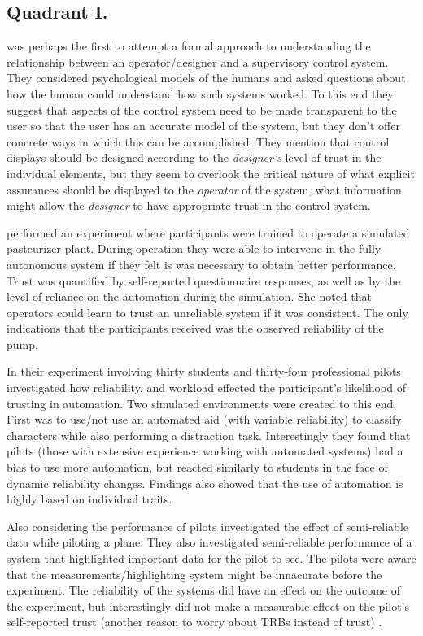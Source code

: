 \subsection{Quadrant I.}
\citet{Sheridan1984-kx} was perhaps the first to attempt a formal approach to understanding the relationship between an operator/designer and a supervisory control system. They considered psychological models of the humans and asked questions about how the human could understand how such systems worked. To this end they suggest that aspects of the control system need to be made transparent to the user so that the user has an accurate model of the system, but they don't offer concrete ways in which this can be accomplished. They mention that control displays should be designed according to the \emph{designer's} level of trust in the individual elements, but they seem to overlook the critical nature of what explicit assurances should be displayed to the \emph{operator} of the system,  what information might allow the \emph{designer} to have appropriate trust in the control system.

\citet{Muir1996-gt} performed an experiment where participants were trained to operate a simulated pasteurizer plant. During operation they were able to intervene in the fully-autonomous system if they felt is was necessary to obtain better performance. Trust was quantified by self-reported questionnaire responses, as well as by the level of reliance on the automation during the simulation. She noted that operators could learn to trust an unreliable system if it was consistent. The only indications that the participants received was the observed reliability of the pump. 

In their experiment involving thirty students and thirty-four professional pilots \citet{Riley1996-qm} investigated how reliability, and workload effected the participant's likelihood of trusting in automation. Two simulated environments were created to this end. First was to use/not use an automated aid (with variable reliability) to classify characters while also performing a distraction task. Interestingly they found that pilots (those with extensive experience working with automated systems) had a bias to use more automation, but reacted similarly to students in the face of dynamic reliability changes. Findings also showed that the use of automation is highly based on individual traits.

Also considering the performance of pilots \citet{Wickens1999-la} investigated the effect of semi-reliable data while piloting a plane. They also investigated semi-reliable performance of a system that highlighted important data for the pilot to see. The pilots were aware that the measurements/highlighting system might be innacurate before the experiment. The reliability of the systems did have an effect on the outcome of the experiment, but interestingly did not make a measurable effect on the pilot's self-reported trust (another reason to worry about TRBs instead of trust) .

